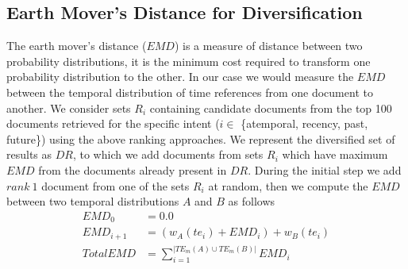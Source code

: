 \documentclass{sig-alternate}
\begin{document}
\subsection{Earth Mover's Distance for Diversification}
The earth mover's distance ($EMD$) is a measure of distance between two probability distributions, it is the minimum cost required to transform one probability distribution to the other. In our case we would measure the $EMD$ between the temporal distribution of time references from one document to another. We consider sets $R_{i}$ containing candidate documents from the top 100 documents retrieved for the specific intent ($i \in$ \{atemporal, recency, past, future\}) using the above ranking approaches. We represent the diversified set of results as $DR$, to which we add documents from sets $R_{i}$ which have maximum $EMD$ from the documents already present in $DR$. During the initial step we add $rank\ 1$ document from one of the sets $R_{i}$ at random, then we compute the $EMD$ between two temporal distributions $A$ and $B$ as follows
\begin{equation}\label{eq:7}
	\begin{aligned}
		EMD_{0} &= 0.0  \\
		EMD_{i+1} &= (w_{A}(te_{i}) + EMD_{i}) + w_{B}(te_{i}) \\
		TotalEMD &= \sum\limits_{i=1}^{|TE_{m}(A) \cup TE_{m}(B)|}EMD_{i}
	\end{aligned}
\end{equation}
\end{document}
